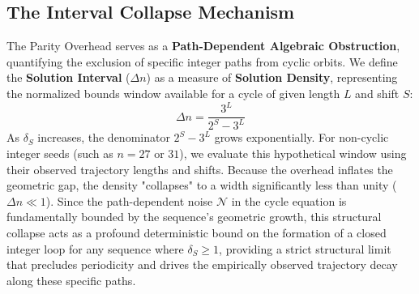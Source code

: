\documentclass[11pt, a4paper]{article}
\theoremstyle{definition}
\begin{document}
\subsection{The Interval Collapse Mechanism}
The Parity Overhead serves as a \textbf{Path-Dependent Algebraic Obstruction}, quantifying the exclusion of specific integer paths from cyclic orbits. We define the \textbf{Solution Interval} ($\Delta n$) as a measure of \textbf{Solution Density}, representing the normalized bounds window available for a cycle of given length $L$ and shift $S$:
\begin{equation}
\Delta n = \frac{3^L}{2^S - 3^L}
\end{equation}
As $\delta_S$ increases, the denominator $2^S - 3^L$ grows exponentially. For non-cyclic integer seeds (such as $n=27$ or $31$), we evaluate this hypothetical window using their observed trajectory lengths and shifts. Because the overhead inflates the geometric gap, the density "collapses" to a width significantly less than unity ($\Delta n \ll 1$). Since the path-dependent noise $\mathcal{N}$ in the cycle equation is fundamentally bounded by the sequence's geometric growth, this structural collapse acts as a profound deterministic bound on the formation of a closed integer loop for any sequence where $\delta_S \ge 1$, providing a strict structural limit that precludes periodicity and drives the empirically observed trajectory decay along these specific paths.
\end{document}
